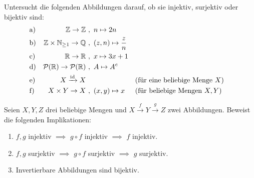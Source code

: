 \begin{aufg}
    Untersucht die folgenden Abbildungen darauf, ob sie injektiv, surjektiv oder bijektiv sind:
    \begin{align*}
        & \text{a)} & \mathbb Z \to \mathbb Z\ &,\ n\mapsto 2n \\
        & \text{b)} & \mathbb Z \times \mathbb N_{\ge 1} \to \mathbb Q\ &,\ (z,n) \mapsto \frac{z}{n} \\
        & \text{c)} & \mathbb R \to \mathbb R\ &,\ x\mapsto 3x+1 \\
        & \text{d)} & \mathcal P(\mathbb R) \to \mathcal P(\mathbb R) \ &,\ A \mapsto A^c \\
        & \text{e)} & X\xrightarrow{\mathrm{id}} X\ & && (\text{für eine beliebige Menge $X$}) \\
        & \text{f)} & X\times Y \to X \ &,\ (x,y) \mapsto x && (\text{für beliebige Mengen $X,Y$})
    \end{align*}
\end{aufg}


\begin{aufg} \label{aufg:bijektiviso}
    Seien $X,Y,Z$ drei beliebige Mengen und $X \xrightarrow{f} Y \xrightarrow{g} Z$ zwei Abbildungen. Beweist die folgenden Implikationen:
    \begin{enumerate}
        \item $f,g$ injektiv $\implies$ $g\circ f$ injektiv $\implies$ $f$ injektiv.
        \item $f,g$ surjektiv $\implies$ $g\circ f$ surjektiv $\implies$ $g$ surjektiv.
        \item Invertierbare Abbildungen sind bijektiv.
    \end{enumerate}
\end{aufg}

